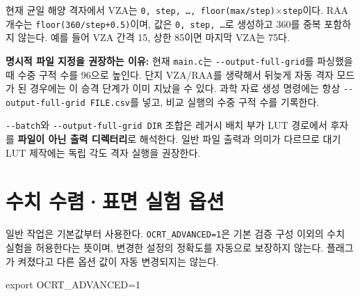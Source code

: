 현재 균일 해양 격자에서 VZA는 \texttt{0,\allowbreak{} step,\allowbreak{} \ldots{},\allowbreak{} floor(max/\allowbreak{}step)\ensuremath{\times}step}이다. RAA 개수는 \texttt{floor(360/\allowbreak{}step+0.\allowbreak{}5)}이며, 값은 \texttt{0,\allowbreak{} step,\allowbreak{} \ldots{}}로 생성하고 360\textdegree{}를 중복 포함하지 않는다. 예를 들어 VZA 간격 15\textdegree{}, 상한 85\textdegree{}이면 마지막 VZA는 75\textdegree{}다.

\textbf{명시적 파일 지정을 권장하는 이유:} 현재 \texttt{main.\allowbreak{}c}는 \texttt{-\allowbreak{}-\allowbreak{}output-\allowbreak{}full-\allowbreak{}grid}를 파싱했을 때 수중 구적 수를 96으로 높인다. 단지 VZA/RAA를 생략해서 뒤늦게 자동 격자 모드가 된 경우에는 이 승격 단계가 이미 지났을 수 있다. 과학 자료 생성 명령에는 항상 \texttt{-\allowbreak{}-\allowbreak{}output-\allowbreak{}full-\allowbreak{}grid FILE.\allowbreak{}csv}를 넣고, 비교 실행의 수중 구적 수를 기록한다.

\texttt{-\allowbreak{}-\allowbreak{}batch}와 \texttt{-\allowbreak{}-\allowbreak{}output-\allowbreak{}full-\allowbreak{}grid DIR} 조합은 레거시 배치 부가 LUT 경로에서 후자를 \textbf{파일이 아닌 출력 디렉터리}로 해석한다. 일반 파일 출력과 의미가 다르므로 대기 LUT 제작에는 독립 각도 격자 실행을 권장한다.

\section{수치 수렴·표면 실험 옵션}
\label{sec:auto:03_options:8}


일반 작업은 기본값부터 사용한다. \texttt{OCRT\_\allowbreak{}ADVANCED=\allowbreak{}1}은 기본 검증 구성 이외의 수치 실험을 허용한다는 뜻이며, 변경한 설정의 정확도를 자동으로 보장하지 않는다. 플래그가 켜졌다고 다른 옵션 값이 자동 변경되지는 않는다.




\begin{ManualCode}
export OCRT_ADVANCED=1
\end{ManualCode}


